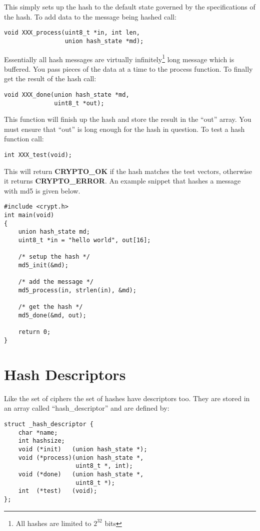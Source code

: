 \documentclass{book}
\begin{document}
This simply sets up the hash to the default state governed by the specifications of the hash.  To add data to the 
message being hashed call:
\begin{verbatim}
void XXX_process(uint8_t *in, int len, 
                 union hash_state *md);
\end{verbatim}

Essentially all hash messages are virtually infinitely\footnote{All hashes are limited to $2^{32}$ bits} long message which is 
buffered.  You pass pieces of the data at a time to the process function.  To finally get the result of the hash
call:
\begin{verbatim}
void XXX_done(union hash_state *md, 
              uint8_t *out);
\end{verbatim}

This function will finish up the hash and store the result in the ``out'' array.  You must ensure that ``out'' is long
enough for the hash in question.  To test a hash function call:
\begin{verbatim}
int XXX_test(void);
\end{verbatim}

This will return {\bf CRYPTO\_OK} if the hash matches the test vectors, otherwise it returns {\bf CRYPTO\_ERROR}.  An
example snippet that hashes a message with md5 is given below.
\begin{verbatim}
#include <crypt.h>
int main(void)
{
    union hash_state md;
    uint8_t *in = "hello world", out[16];

    /* setup the hash */
    md5_init(&md);

    /* add the message */
    md5_process(in, strlen(in), &md);

    /* get the hash */
    md5_done(&md, out);

    return 0;
}
\end{verbatim}

\section{Hash Descriptors}

Like the set of ciphers the set of hashes have descriptors too.  They are stored in an array called ``hash\_descriptor'' and
are defined by:
\begin{verbatim}
struct _hash_descriptor {
    char *name;
    int hashsize;
    void (*init)   (union hash_state *);
    void (*process)(union hash_state *, 
                    uint8_t *, int);
    void (*done)   (union hash_state *, 
                    uint8_t *);
    int  (*test)   (void);
};
\end{verbatim}
\end{document}
